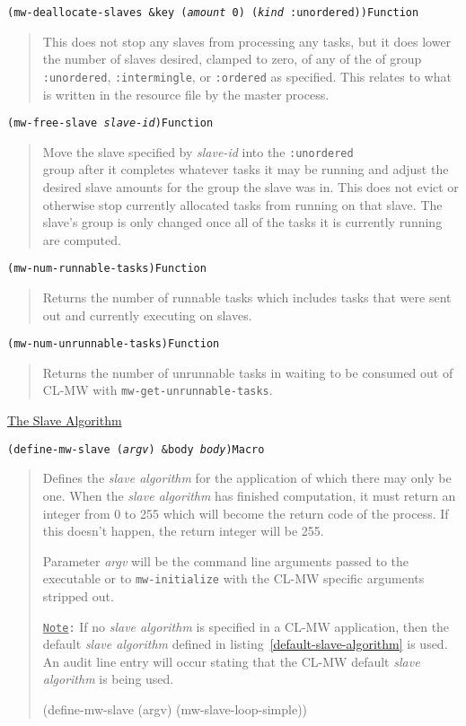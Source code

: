 \documentclass[titlepage,12pt]{book}
\newcommand{\xsmall}{\latexhtml{\small}{}}
\newcommand{\xnormalsize}{\latexhtml{\normalsize}{}}
\newcommand{\clmw}{\xsmall\textsc{CL-MW}\xnormalsize\xspace}
\newcommand{\sa}{\textit{slave algorithm}\xspace}
\newcommand{\un}{\texttt{:unordered}\xspace}
\newcommand{\inter}{\texttt{:intermingle}\xspace}
\newcommand{\ord}{\texttt{:ordered}\xspace}
\newcommand{\func}[1]{\mbox{\texttt{#1}}\xspace}
\newcommand{\Note}{\texttt{\underline{Note}:}\xspace}
\newcommand{\apiheader}[1]{\begin{center}\underline{#1}\end{center}}
\newcommand{\apifunc}[2]{\noindent\xsmall\texttt{(#1)}\hspace*{\fill}\xnormalsize\texttt{#2}}
\newenvironment{apientry}[2]
	{\apifunc{#1}{#2}\begin{quotation}}
	{\end{quotation}}
\newcommand{\phlabel}[1]{\phantomsection\label{#1}}
\begin{document}
\begin{apientry}
{mw-deallocate-slaves \&key (\emph{amount} 0) (\emph{kind} :unordered)}
{Function}
This does not stop any slaves from processing any tasks, but it does lower
the number of slaves desired, clamped to zero, of any of the of group
\un, \inter, or \ord as specified. This relates to what is written in the
resource file by the master process.
\end{apientry}

\begin{apientry}
{mw-free-slave \emph{slave-id}}
{Function}
Move the slave specified by \emph{slave-id} into the \un \\ group
after it completes whatever tasks it may be running and adjust the
desired slave amounts for the group the slave was in. This does not
evict or otherwise stop currently allocated tasks from running on
that slave. The slave's group is only changed once all of the tasks
it is currently running are computed.  \end{apientry}

\begin{apientry}
{mw-num-runnable-tasks}
{Function}
Returns the number of runnable tasks which includes tasks that were
sent out and currently executing on slaves.
\end{apientry}

\begin{apientry}
{mw-num-unrunnable-tasks}
{Function}
Returns the number of unrunnable tasks in waiting to be consumed out
of \clmw with \func{mw-get-unrunnable-tasks}.
\end{apientry}

\apiheader{\phlabel{slave-algorithm-api}The Slave Algorithm}
\begin{apientry}
{define-mw-slave (\emph{argv}) \&body \emph{body}}
{Macro}
Defines the \sa for the application of which there may only be one.
When the \sa has finished computation, it must return an integer from 0 to 255
which will become the return code of the process. If this doesn't happen,
the return integer will be 255.

Parameter \emph{argv} will be the command line arguments passed to
the executable or to \func{mw-initialize} with the \clmw specific
arguments stripped out.

\Note If no \sa is specified in a \clmw application, then the default \sa
defined in listing~\ref{default-slave-algorithm} is used. An audit line
entry will occur stating that the \clmw default \sa is being used.

\begin{lisp}[label=default-slave-algorithm,caption=Default Slave Algorithm]
(define-mw-slave (argv)
  (mw-slave-loop-simple))
\end{lisp}

\end{apientry}
\end{document}
